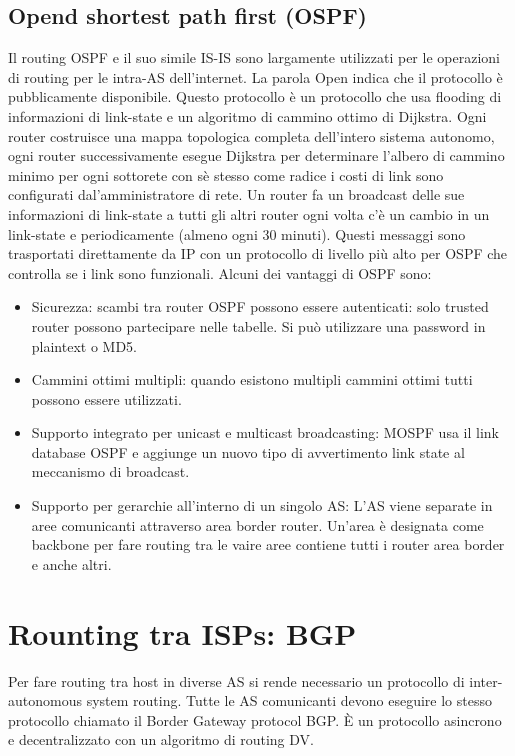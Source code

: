 \subsection{Opend shortest path first (OSPF)}
Il routing OSPF e il suo simile IS-IS sono largamente utilizzati per le operazioni di routing per le intra-AS dell'internet. La parola Open indica che il 
protocollo \`e pubblicamente disponibile. Questo protocollo \`e un protocollo che usa flooding di informazioni di link-state e un algoritmo di cammino 
ottimo di Dijkstra. Ogni router costruisce una mappa topologica completa dell'intero sistema autonomo, ogni router successivamente esegue Dijkstra per 
determinare l'albero di cammino minimo per ogni sottorete con s\`e stesso come radice i costi di link sono configurati dal'amministratore di rete. Un router
fa un broadcast delle sue informazioni di link-state a tutti gli altri router ogni volta c'\`e un cambio in un link-state e periodicamente (almeno ogni 30
minuti). Questi messaggi sono trasportati direttamente da IP con un protocollo di livello pi\`u alto per OSPF che controlla se i link sono funzionali. 
Alcuni dei vantaggi di OSPF sono:
\begin{itemize}
\item Sicurezza: scambi tra router OSPF possono essere autenticati: solo trusted router possono partecipare nelle tabelle. Si pu\`o utilizzare una password
in plaintext o MD5.
\item Cammini ottimi multipli: quando esistono multipli cammini ottimi tutti possono essere utilizzati. 
\item Supporto integrato per unicast e multicast broadcasting: MOSPF usa il link database OSPF e aggiunge un nuovo tipo di avvertimento link state al 
meccanismo di broadcast.
\item Supporto per gerarchie all'interno di un singolo AS: L'AS viene separate in aree comunicanti attraverso area border router. Un'area \`e designata come
backbone per fare routing tra le vaire aree contiene tutti i router area border e anche altri. 
\end{itemize}
\section{Rounting tra ISPs: BGP}
Per fare routing tra host in diverse AS si rende necessario un protocollo di inter-autonomous system routing. Tutte le AS comunicanti devono eseguire lo 
stesso protocollo chiamato il Border Gateway protocol BGP. \`E un protocollo asincrono e decentralizzato con un algoritmo di routing DV. 
